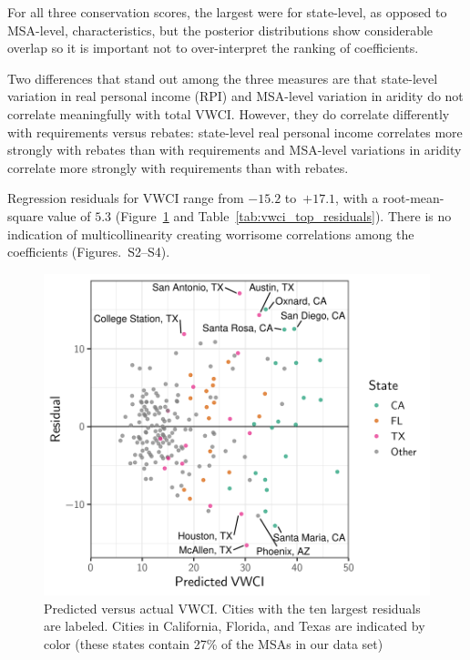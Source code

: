 \documentclass[draft,linenumbers]{agujournal}\usepackage{knitr}
\begin{document}
For all three conservation scores, the largest  were for state-level,
as opposed to MSA-level, characteristics, but the posterior distributions show
considerable overlap so it is important not to over-interpret the ranking of
coefficients.

Two differences that stand out among the three measures are that state-level
variation in real personal income (RPI) and MSA-level variation in aridity
do not correlate meaningfully with
total VWCI. However, they do
correlate differently with
requirements versus rebates:
state-level real personal income
correlates more strongly with rebates
than with requirements
and MSA-level variations in aridity
correlate more strongly with requirements
than with rebates.

%
%

Regression residuals for VWCI range
from $-15.2$
to~$+17.1$,
with a root-mean-square value of
$5.3$
(Figure~\ref{fig:vwci_residuals} and Table~\ref{tab:vwci_top_residuals}).
There is no indication of multicollinearity creating worrisome correlations
among the coefficients (Figures.~S2--S4).
%
%
\begin{figure}[tb]

{\centering \includegraphics[width=0.8\linewidth]{figures_clean/vwci_residuals-1} 

}

\caption[Predicted versus actual VWCI]{Predicted versus actual VWCI. Cities with the ten largest residuals are labeled. Cities in California, Florida, and Texas are indicated by color (these states contain 27\% of the MSAs in our data set)}\label{fig:vwci_residuals}
\end{figure}
\end{document}

